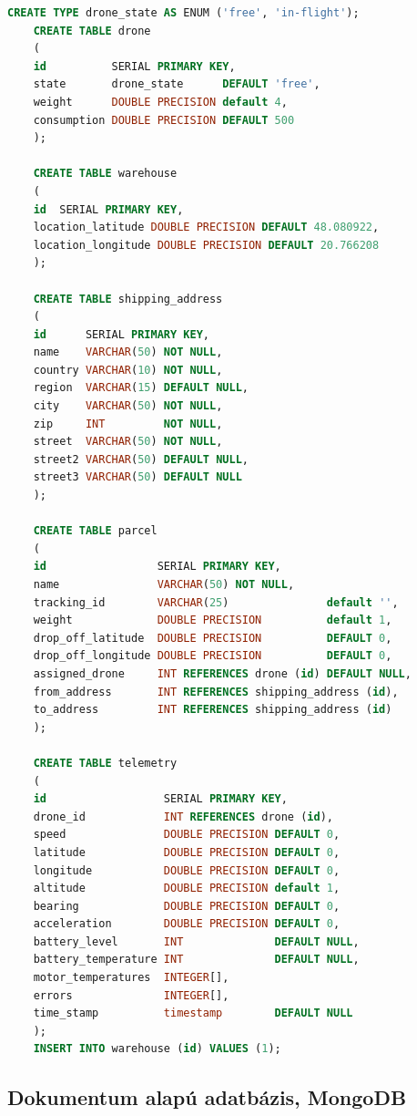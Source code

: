 \begin{lstlisting}[language=sql]
    CREATE TYPE drone_state AS ENUM ('free', 'in-flight');
    CREATE TABLE drone
    (
    id          SERIAL PRIMARY KEY,
    state       drone_state      DEFAULT 'free',
    weight      DOUBLE PRECISION default 4,
    consumption DOUBLE PRECISION DEFAULT 500
    );

    CREATE TABLE warehouse
    (
    id  SERIAL PRIMARY KEY,
    location_latitude DOUBLE PRECISION DEFAULT 48.080922,
    location_longitude DOUBLE PRECISION DEFAULT 20.766208
    );

    CREATE TABLE shipping_address
    (
    id      SERIAL PRIMARY KEY,
    name    VARCHAR(50) NOT NULL,
    country VARCHAR(10) NOT NULL,
    region  VARCHAR(15) DEFAULT NULL,
    city    VARCHAR(50) NOT NULL,
    zip     INT         NOT NULL,
    street  VARCHAR(50) NOT NULL,
    street2 VARCHAR(50) DEFAULT NULL,
    street3 VARCHAR(50) DEFAULT NULL
    );

    CREATE TABLE parcel
    (
    id                 SERIAL PRIMARY KEY,
    name               VARCHAR(50) NOT NULL,
    tracking_id        VARCHAR(25)               default '',
    weight             DOUBLE PRECISION          default 1,
    drop_off_latitude  DOUBLE PRECISION          DEFAULT 0,
    drop_off_longitude DOUBLE PRECISION          DEFAULT 0,
    assigned_drone     INT REFERENCES drone (id) DEFAULT NULL,
    from_address       INT REFERENCES shipping_address (id),
    to_address         INT REFERENCES shipping_address (id)
    );

    CREATE TABLE telemetry
    (
    id                  SERIAL PRIMARY KEY,
    drone_id            INT REFERENCES drone (id),
    speed               DOUBLE PRECISION DEFAULT 0,
    latitude            DOUBLE PRECISION DEFAULT 0,
    longitude           DOUBLE PRECISION DEFAULT 0,
    altitude            DOUBLE PRECISION default 1,
    bearing             DOUBLE PRECISION DEFAULT 0,
    acceleration        DOUBLE PRECISION DEFAULT 0,
    battery_level       INT              DEFAULT NULL,
    battery_temperature INT              DEFAULT NULL,
    motor_temperatures  INTEGER[],
    errors              INTEGER[],
    time_stamp          timestamp        DEFAULT NULL
    );
    INSERT INTO warehouse (id) VALUES (1);
\end{lstlisting}


\subsection{Dokumentum alapú adatbázis, MongoDB}



